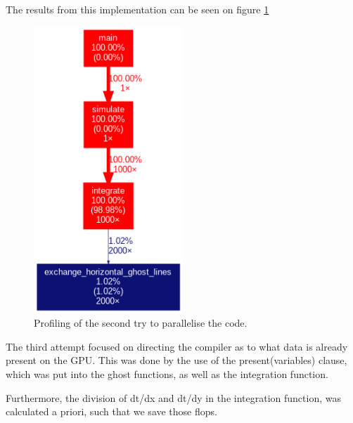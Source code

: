 \documentclass{article}
\begin{document}
The results from this implementation can be seen on figure \ref{fig:profiling:secondattempt}
\begin{figure}[h]
    \includegraphics[width=0.5\textwidth]{./figures/sequential_profile.png}
    \centering
    \caption{Profiling of the second try to parallelise the code. }
    \label{fig:profiling:secondattempt}
\end{figure}

The third attempt focused on directing the compiler as to what data is already present on the GPU. This was done by the use of the present(variables) clause, which was put into the ghost functions, as well as the integration function.

Furthermore, the division of dt/dx and dt/dy in the integration function, was calculated a priori, such that we save those flops.
\end{document}

